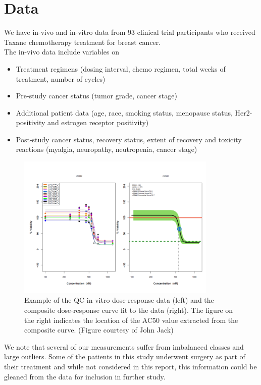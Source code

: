 \documentclass[12pt]{article}
\begin{document}
\newpage

\section{Data}

We have in-vivo and in-vitro data from 93 clinical trial participants who received Taxane chemotherapy treatment for breast cancer. \\

The in-vivo data include variables on 
\begin{itemize}
	\item Treatment regimens (dosing interval, chemo regimen, total weeks of treatment, number of cycles)
	\item Pre-study cancer status (tumor grade, cancer stage)
	\item Additional patient data (age, race, smoking status, menopause status, Her2-positivity and estrogen receptor positivity)
	\item Post-study cancer status, recovery status, extent of recovery and toxicity reactions (myalgia, neuropathy, neutropenia, cancer stage)
\end{itemize}
\begin{figure}[h]
\caption{Example of the QC in-vitro dose-response data (left) and the composite dose-response curve fit to the data (right).  The figure on the right indicates the location of the AC50 value extracted from the composite curve. (Figure courtesy of John Jack)}
\centering
\includegraphics[width=0.85\textwidth]{CompositeCurve.png}
\end{figure}
We note that several of our measurements suffer from imbalanced classes and large outliers. Some of the patients in this study underwent surgery as part of their treatment and while not considered in this report, this information could be gleaned from the data for inclusion in further study. \\
\end{document}
